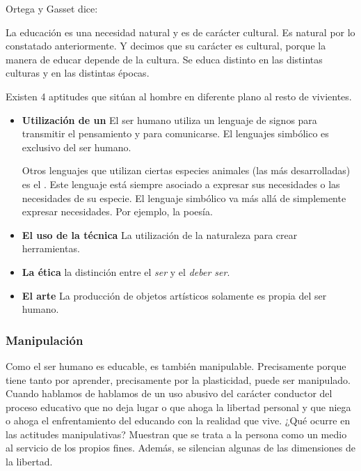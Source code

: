 \documentclass[palatino]{apuntesURJC}
\renewcommand{\hl}[1]{#1}
\renewcommand{\ul}[1]{#1}
\begin{document}
\ul{Ortega y Gasset}  dice:

\hl{La educación es una necesidad natural y es de carácter cultural}.
%
Es natural por lo constatado anteriormente.
%
Y decimos que su carácter es cultural, porque la manera de educar depende de la cultura.
%
Se educa distinto en las distintas culturas y en las distintas épocas.


Existen 4 aptitudes que sitúan al hombre en diferente plano al resto de vivientes.
\begin{itemize}
	\item \textbf{Utilización de un } El ser humano utiliza un \hl{lenguaje de signos para transmitir el pensamiento y para comunicarse}. El lenguajes simbólico es exclusivo del ser humano.

	Otros lenguajes que utilizan ciertas especies animales (las más desarrolladas) es el \concept[Lenguaje\IS Dígito]{\ul{lenguaje dígito}}.
	Este lenguaje está siempre \ul{asociado a expresar sus necesidades} o las necesidades de su especie.
	El lenguaje simbólico va más allá de simplemente expresar necesidades. Por ejemplo, la poesía.

	\item \textbf{El uso de la técnica} La utilización de la naturaleza para crear herramientas.
	\item \textbf{La ética} la distinción entre el \textit{ser} y el \textit{deber ser}.
	\item \textbf{El arte} La producción de objetos artísticos solamente es propia del ser humano.
\end{itemize}


\subsubsection{Manipulación}

Como el ser humano es educable, es también manipulable. Precisamente porque tiene tanto por aprender, precisamente por la plasticidad, puede ser manipulado.
%
Cuando hablamos de  hablamos de un uso abusivo del carácter conductor del proceso educativo que no deja lugar o que ahoga la libertad personal y que niega o ahoga el enfrentamiento del educando con la realidad que vive.
%
¿Qué ocurre en las actitudes manipulativas? Muestran que se trata a la persona como un medio al servicio de los propios fines.
%
Además, se silencian algunas de las dimensiones de la libertad.
\end{document}
